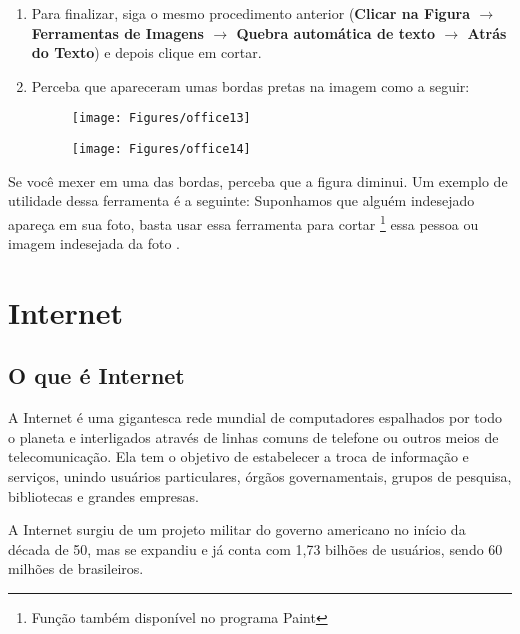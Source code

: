 \documentclass[hidelinks,12pt]{article}
\begin{document}
\begin{enumerate}
			\item Para finalizar, siga o mesmo procedimento anterior (\textbf{Clicar na Figura  $\rightarrow$ Ferramentas de Imagens $\rightarrow$ Quebra automática de texto $\rightarrow$  Atrás do Texto}) e depois clique em cortar.

			\newpage

			\item  Perceba que apareceram umas bordas pretas na imagem como a seguir:
			\begin{figure}[!htbp]
				\centering
				\begin{minipage}[b]{0.6\textwidth}
					\texttt{[image: Figures/office13]}

				\end{minipage}
				\hfill
				\begin{minipage}[b]{0.6\textwidth}
					\texttt{[image: Figures/office14]}

				\end{minipage}
			\end{figure}


		\end{enumerate}

		Se você mexer em uma das bordas, perceba que a figura diminui. Um exemplo de utilidade dessa ferramenta é a seguinte: Suponhamos que alguém indesejado apareça em sua foto, basta usar essa ferramenta para cortar \footnote{Função também disponível no programa Paint} essa pessoa ou imagem indesejada da foto .

		\section{Internet}

		\subsection{O que é Internet}

		A Internet é uma gigantesca rede mundial de computadores espalhados por todo o planeta e interligados através de linhas comuns de telefone ou outros meios de telecomunicação. Ela tem o objetivo de estabelecer a troca de informação e serviços, unindo usuários particulares, órgãos governamentais, grupos de pesquisa, bibliotecas e grandes empresas.

		A Internet surgiu de um projeto militar do governo americano no início da década de 50, mas se expandiu e já conta com 1,73 bilhões de usuários, sendo 60 milhões de brasileiros.
\end{document}
